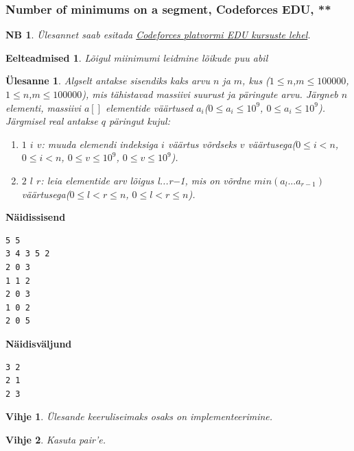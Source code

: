 \documentclass{trkut}
\newtheorem*{prereq}{Eelteadmised}
\newtheorem*{extra}{NB}
\newtheorem*{vihje}{Vihje}
\newtheorem*{Text}{Ülesanne}
\begin{document}
\subsubsection{Number of minimums on a segment, Codeforces EDU, **}
\begin{extra}
Ülesannet saab esitada \href{https://codeforces.com/edu/course/2/lesson/4/1/practice/contest/273169/problem/C}{Codeforces platvormi EDU kursuste lehel}.
\end{extra}
\begin{prereq}
Lõigul miinimumi leidmine lõikude puu abil
\end{prereq}
\begin{Text}
Algselt antakse sisendiks kaks arvu $n$ ja $m$, kus ($1\le n$,$m\le 100000$,$1\le n$,$m\le 100000$), mis tähistavad massiivi suurust ja päringute arvu.
Järgneb $n$ elementi, massiivi $a[]$ elementide väärtused $a_i$($0\le a_i\le 10^9$, $0\le a_i\le 10^9$).
Järgmisel real antakse $q$ päringut kujul:
\begin{enumerate}
\item $1$ $i$ $v$: muuda elemendi indeksiga $i$ väärtus võrdseks $v$ väärtusega($0\le i<n$, $0\le i<n$, $0\le v\le 10^9$, $0\le v\le 10^9$).
\item $2$ $l$ $r$: leia elementide arv lõigus l...r−1, mis on võrdne $min(a_l...a_{r-1})$ väärtusega($0\le l<r\le n$, $0\le l<r\le n$).
\end{enumerate}

\parencite{minseg}
\end{Text}



\textbf{Näidissisend}

\begin{verbatim}
5 5
3 4 3 5 2
2 0 3
1 1 2
2 0 3
1 0 2
2 0 5
\end{verbatim}

\textbf{Näidisväljund}

\begin{verbatim}
3 2
2 1
2 3
\end{verbatim}



\begin{vihje}
Ülesande keeruliseimaks osaks on implementeerimine.
\end{vihje}

\begin{vihje}
Kasuta pair'e.
\end{vihje}
\end{document}
